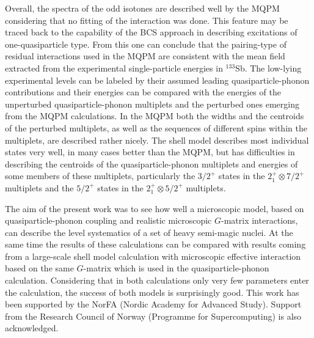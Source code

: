 Overall, the spectra of the odd isotones are described well by the MQPM
considering that no fitting of the interaction was done.
This feature may be traced back to the capability of 
the BCS approach in describing
excitations of one-quasiparticle type. From this one can conclude that
the pairing-type of residual interactions used in the MQPM are consistent
with the mean field extracted from the experimental single-particle
energies in $^{133}$Sb. The low-lying experimental levels can be
labeled by their assumed leading quasiparticle-phonon contributions
and their energies can be compared with the energies of the unperturbed
quasiparticle-phonon multiplets and the perturbed ones emerging from
the MQPM calculations. In the MQPM both the widths and the centroids 
of the perturbed multiplets, as well as the sequences of different spins 
within the multiplets, are described rather nicely. The shell model
describes most individual states very well, in many cases better than
the MQPM, but has difficulties in describing the centroids of the 
quasiparticle-phonon multiplets and energies of some members of these 
multiplets, particularly the $3/2^+$ states in the $2^+_1\otimes 7/2^+$ 
multiplets and the $5/2^+$ states in the $2^+_1\otimes 5/2^+$ multiplets.

The aim of the present work was to see how well a microscopic
model, based on quasiparticle-phonon coupling and realistic microscopic
$G$-matrix interactions, can describe the level
systematics of a set of heavy semi-magic nuclei. At the same time
the results of these calculations can be compared with results coming
from a large-scale shell model calculation with microscopic
effective interaction based on the same $G$-matrix which is used in the 
quasiparticle-phonon calculation. Considering that in both calculations
only very few parameters enter the calculation, the success of both models
is surprisingly good.\newline
\newline
\newline
This work has been supported by the NorFA (Nordic Academy for Advanced Study).
Support from the Research Council of Norway (Programme for 
Supercomputing)  is also acknowledged.


